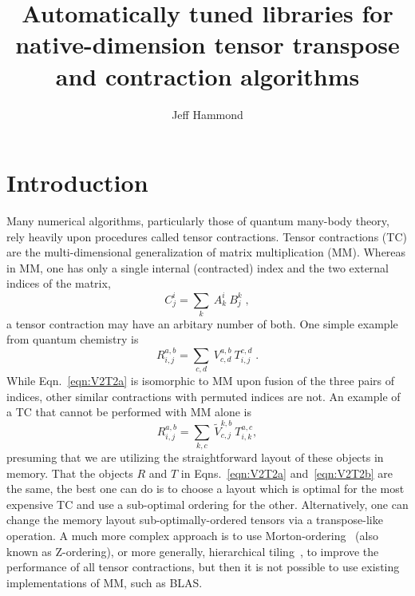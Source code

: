 \documentclass[letterpaper,12pt]{article}
\begin{document}
\title{Automatically tuned libraries for native-dimension tensor transpose and contraction algorithms}
\author{Jeff Hammond}


\begin{abstract}

\end{abstract}

\section{Introduction}

Many numerical algorithms, particularly those of quantum many-body theory, rely heavily upon procedures called tensor contractions.  Tensor contractions (TC) are the multi-dimensional generalization of matrix multiplication (MM).  Whereas in MM, one has only a single internal (contracted) index and the two external indices of the matrix,
\begin{equation}
 C^{i}_{j} = \sum_{k}~A^{i}_{k}~B^{k}_{j}\;,
\end{equation}
a tensor contraction may have an arbitary number of both.  One simple example from quantum chemistry is
\begin{equation}\label{eqn:V2T2a}
 R^{a,b}_{i,j} = \sum_{c,d}~V^{a,b}_{c,d}~T^{c,d}_{i,j}\;.
\end{equation}
While Eqn.~\ref{eqn:V2T2a} is isomorphic to MM upon fusion of the three pairs of indices, other similar contractions with permuted indices are not.  An example of a TC that cannot be performed with MM alone is
\begin{equation}\label{eqn:V2T2b}
 R^{a,b}_{i,j} = \sum_{k,c}~\tilde{V}^{k,b}_{c,j}~T^{a,c}_{i,k},
\end{equation}
presuming that we are utilizing the straightforward layout of these objects in memory.  That the objects $R$ and $T$ in Eqns.~\ref{eqn:V2T2a} and~\ref{eqn:V2T2b} are the same, the best one can do is to choose a layout which is optimal for the most expensive TC and use a sub-optimal ordering for the other.  Alternatively, one can change the memory layout sub-optimally-ordered tensors via a transpose-like operation.  A much more complex approach is to use Morton-ordering~\cite{Morton} (also known as Z-ordering), or more generally, hierarchical tiling~\cite{HTiling}, to improve the performance of all tensor contractions, but then it is not possible to use existing implementations of MM, such as BLAS.
\end{document}
